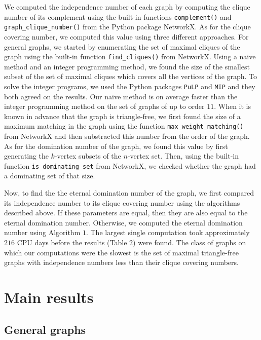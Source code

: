 \documentclass[11pt]{article}
\begin{document}
	We computed the independence number of each graph by computing the clique number of its complement using the built-in functions \verb|complement()| and \verb|graph_clique_number()| from the Python package NetworkX. As for the clique covering number, we computed this value using three different approaches. For general graphs, we started by enumerating the set of maximal cliques of the graph using the built-in function \verb|find_cliques()| from NetworkX. Using a naive method and an integer programming method, we found the size of the smallest subset of the set of maximal cliques which covers all the vertices of the graph. To solve the integer programs, we used the Python packages \verb|PuLP| and \verb|MIP| and they both agreed on the results. Our naive method is on average faster than the integer programming method on the set of graphs of up to order $11$. When it is known in advance that the graph is triangle-free, we first found the size of a maximum matching in the graph using the function \verb|max_weight_matching()| from NetworkX and then substracted this number from the order of the graph. As for the domination number of the graph, we found this value by first generating the $k$-vertex subsets of the $n$-vertex set. Then, using the built-in function \verb|is_dominating_set| from NetworkX, we checked whether the graph had a dominating set of that size.
	
	Now, to find the the eternal domination number of the graph, we first compared its independence number to its clique covering number using the algorithms described above. If these parameters are equal, then they are also equal to the eternal domination number. Otherwise, we computed the eternal domination number using Algorithm $1$. The largest single computation took approximately $216$ CPU days before the results (Table $2$) were found. The class of graphs on which our computations were the slowest is the set of maximal triangle-free graphs with independence numbers less than their clique covering numbers.
	
	
	\section{Main results} \label{Section:MainResults}

	\subsection{General graphs} \label{Section:GeneralGraphs}
	
\end{document}
